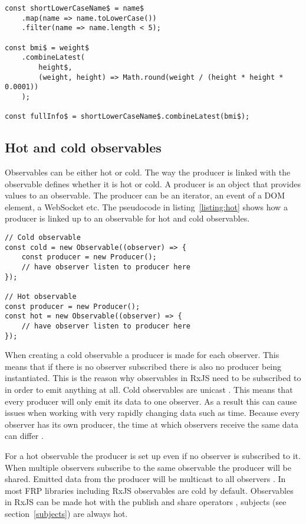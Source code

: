 \begin{lstlisting}[caption=Reactive BMI calculator source code \cite{debug},label=listing:bmi]
const shortLowerCaseName$ = name$
	.map(name => name.toLowerCase())
	.filter(name => name.length < 5);

const bmi$ = weight$
	.combineLatest(
		height$,
		(weight, height) => Math.round(weight / (height * height * 0.0001))
	);

const fullInfo$ = shortLowerCaseName$.combineLatest(bmi$);
\end{lstlisting}

\subsection{Hot and cold observables}

Observables can be either hot or cold. The way the producer is linked with the observable defines whether it is hot or cold. A producer is an object that provides values to an observable. The producer can be an iterator, an event of a DOM element, a WebSocket etc. The pseudocode in listing~\ref{listing:hot} shows how a producer is linked up to an observable for hot and cold observables.

\begin{lstlisting}[caption=Hot and cold observables in RxJS \cite{hot},label=listing:hot]
// Cold observable
const cold = new Observable((observer) => {
	const producer = new Producer();
	// have observer listen to producer here
});

// Hot observable
const producer = new Producer();
const hot = new Observable((observer) => {
	// have observer listen to producer here
});
\end{lstlisting}

When creating a cold observable a producer is made for each observer. This means that if there is no observer subscribed there is also no producer being instantiated. This is the reason why observables in RxJS need to be subscribed to in order to emit anything at all. Cold observables are unicast \cite{hot}. This means that every producer will only emit its data to one observer. As a result this can cause issues when working with very rapidly changing data such as time. Because every observer has its own producer, the time at which observers receive the same data can differ \cite{hot}.

For a hot observable the producer is set up even if no observer is subscribed to it. When multiple observers subscribe to the same observable the producer will be shared. Emitted data from the producer will be multicast to all observers \cite{hot}. In most FRP libraries including RxJS observables are cold by default. Observables in RxJS can be made hot with the publish and share operators \cite{hot}, subjects (see section~\ref{subjects}) are always hot.

